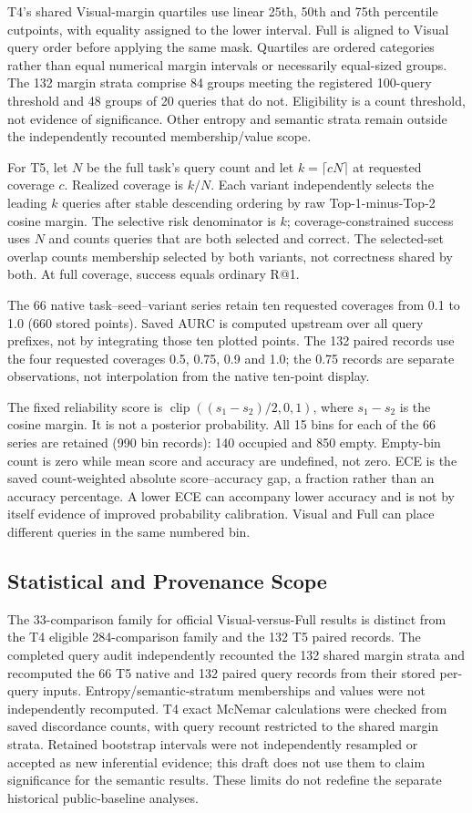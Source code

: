 T4's shared Visual-margin quartiles use linear 25th, 50th and 75th percentile
cutpoints, with equality assigned to the lower interval. Full is aligned
to Visual query order before applying the same mask. Quartiles are ordered
categories rather than equal numerical margin intervals or necessarily
equal-sized groups. The 132 margin strata comprise 84 groups meeting the
registered 100-query threshold and 48 groups of 20 queries that do not.
Eligibility is a count threshold, not evidence of significance. Other
entropy and semantic strata remain outside the independently recounted
membership/value scope.

For T5, let $N$ be the full task's query count and let
$k=\lceil cN\rceil$ at requested coverage $c$. Realized coverage is $k/N$.
Each variant independently selects the leading $k$ queries after stable
descending ordering by raw Top-1-minus-Top-2 cosine margin. The selective
risk denominator is $k$; coverage-constrained success uses $N$ and counts
queries that are both selected and correct. The selected-set overlap counts
membership selected by both variants, not correctness shared by both.
At full coverage, success equals ordinary R@1.

The 66 native task--seed--variant series retain ten requested coverages
from 0.1 to 1.0 (660 stored points). Saved AURC is computed upstream over
all query prefixes, not by integrating those ten plotted points. The 132
paired records use the four requested coverages 0.5, 0.75, 0.9 and 1.0;
the 0.75 records are separate observations, not interpolation from the
native ten-point display.

The fixed reliability score is
$\operatorname{clip}((s_1-s_2)/2,0,1)$, where $s_1-s_2$ is the cosine
margin. It is not a posterior probability. All 15 bins for each of the
66 series are retained (990 bin records): 140 occupied and 850 empty.
Empty-bin count is zero while mean score and accuracy are undefined, not
zero. ECE is the saved count-weighted absolute score--accuracy gap, a
fraction rather than an accuracy percentage. A lower ECE can accompany
lower accuracy and is not by itself evidence of improved probability
calibration. Visual and Full can place different queries in the same
numbered bin.

\subsection{Statistical and Provenance Scope}

The 33-comparison family for official Visual-versus-Full results is distinct
from the T4 eligible 284-comparison family and the 132 T5 paired records.
The completed query audit independently recounted the 132 shared margin
strata and recomputed the 66 T5 native and 132 paired query records from
their stored per-query inputs. Entropy/semantic-stratum memberships and
values were not independently recomputed. T4 exact McNemar calculations
were checked from saved discordance counts, with query recount restricted
to the shared margin strata. Retained bootstrap intervals were not
independently resampled or accepted as new inferential evidence; this draft
does not use them to claim significance for the semantic results. These
limits do not redefine the separate historical public-baseline analyses.


